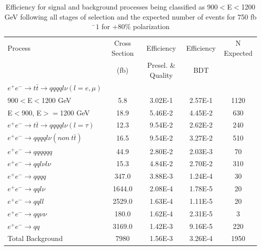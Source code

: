 \begin{table}
  \centering
  \begin{tabular}{l | c | c | c | c}
    \toprule
    Process     & Cross Section & Efficiency & Efficiency & N Expected\\
         & (fb) & Presel. \& Quality & BDT & \\
    \midrule
    $e^+e^-\rightarrow t\bar{t} \rightarrow qqqql\nu (l=e,\mu)$ &  & \\
    900$<$E$<$1200 GeV & 5.8 & 3.02E-1 & 2.57E-1 & 1120\\
    E$<$900, E$>=$1200 GeV & 18.9 & 5.46E-2& 4.45E-2& 630\\
   \midrule
    $e^+e^-\rightarrow t\bar{t} \rightarrow qqqql\nu (l=\tau)$& 12.3 & 9.54E-2 & 2.62E-2& 240\\
    \midrule
    $e^+e^-\rightarrow qqqql\nu (non ~ t\bar{t})$& 16.5 & 9.54E-2 & 3.27E-2 & 510\\
    \midrule
    $e^+e^-\rightarrow qqqqqq$ & 44.9 & 2.80E-2 & 2.03E-3 & 70 \\
    \midrule
    $e^+e^-\rightarrow qql\nu l\nu$ & 15.3  & 4.84E-2 & 2.70E-2 & 310 \\
    \midrule
    $e^+e^-\rightarrow qqqq$ & 347.0 & 3.88E-3 & 1.24E-4 & 30 \\
    \midrule
    $e^+e^-\rightarrow qql\nu$ & 1644.0 & 2.08E-4& 1.78E-5 & 20\\
    \midrule
    $e^+e^-\rightarrow qqll$ & 2529.0 & 1.63E-4 & 1.11E-5 & 20 \\
    \midrule
    $e^+e^-\rightarrow qq\nu\nu$ & 180.0 & 1.62E-4 & 2.31E-5 & 3 \\
    \midrule
    $e^+e^-\rightarrow qq$ & 3169.0 & 1.42E-3 & 9.16E-5 & 220 \\
    \midrule
    \midrule
    Total Background & 7980 & 1.56E-3& 3.26E-4&  1950 \\
    \bottomrule
  \end{tabular}
  \caption{Efficiency for signal and background processes being classified as 900$<$E$<$1200 GeV following all stages of selection and the expected number of events for 750 fb$^-1$ for +80\% polarization}
  \label{table:topfinalefficienciesposMidE}
\end{table}


